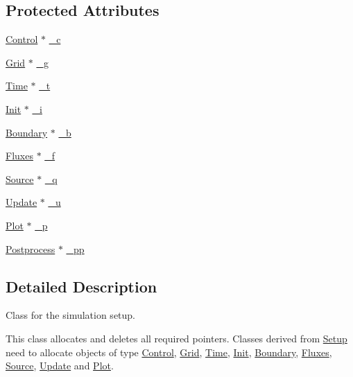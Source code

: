 \subsection*{Protected Attributes}
\begin{DoxyCompactItemize}
\item 
\hyperlink{class_control}{Control} $\ast$ \hyperlink{class_setup_a9b66656cfab0fbe2e17582cd3d9bc392}{\+\_\+c}
\item 
\hyperlink{class_grid}{Grid} $\ast$ \hyperlink{class_setup_a2812ab3c7f7322e9f77e4c4d43053655}{\+\_\+g}
\item 
\hyperlink{class_time}{Time} $\ast$ \hyperlink{class_setup_acbbdb0a7312ce4dd45a64a200d780c3d}{\+\_\+t}
\item 
\hyperlink{class_init}{Init} $\ast$ \hyperlink{class_setup_afc816a430e9d93f357229d9525f686b8}{\+\_\+i}
\item 
\hyperlink{class_boundary}{Boundary} $\ast$ \hyperlink{class_setup_ae76b77049e072bcd37017a5f5c5ebcec}{\+\_\+b}
\item 
\hyperlink{class_fluxes}{Fluxes} $\ast$ \hyperlink{class_setup_acd47ea266d609c5fbef77579608308a5}{\+\_\+f}
\item 
\hyperlink{class_source}{Source} $\ast$ \hyperlink{class_setup_a0b2e5fd96ef68ea898700ead61d27973}{\+\_\+q}
\item 
\hyperlink{class_update}{Update} $\ast$ \hyperlink{class_setup_a873ce4c87704142ce98b6cc0dfd779e7}{\+\_\+u}
\item 
\hyperlink{class_plot}{Plot} $\ast$ \hyperlink{class_setup_ad2cca0e00dff58e8f63a0ec3b652cab7}{\+\_\+p}
\item 
\hyperlink{class_postprocess}{Postprocess} $\ast$ \hyperlink{class_setup_adc487395b8e8221d9b8f0ba0b29d2540}{\+\_\+pp}
\end{DoxyCompactItemize}


\subsection{Detailed Description}
Class for the simulation setup. 

This class allocates and deletes all required pointers. Classes derived from \hyperlink{class_setup}{Setup} need to allocate objects of type \hyperlink{class_control}{Control}, \hyperlink{class_grid}{Grid}, \hyperlink{class_time}{Time}, \hyperlink{class_init}{Init}, \hyperlink{class_boundary}{Boundary}, \hyperlink{class_fluxes}{Fluxes}, \hyperlink{class_source}{Source}, \hyperlink{class_update}{Update} and \hyperlink{class_plot}{Plot}.

